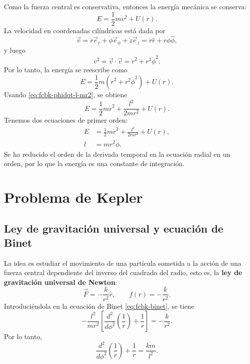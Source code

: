 \documentclass[../apunte_mecanica_clasica.tex]{subfiles}%
\begin{document}
Como la fuerza central es conservativa, entonces la energía mecánica se conserva:
\begin{equation}
    E=\frac{1}{2}mv^2+U(r).
    \label{eq:fcbk-energia-mecanica}
\end{equation}
La velocidad en coordenadas cilíndricas está dada por
\begin{equation}
    \vec v=\dot r\vec e_r+\dot\phi\vec e_\phi+\dot z\vec e_z=\dot r\hat r+r\dot\phi\hat\phi,
    \label{eq:fcbk-velocidad-cilindrica}
\end{equation}
y luego
\begin{equation}
    v^2=\vec v\cdot\vec v=\dot r^2+r^2\dot\phi^2.
    \label{eq:fcbk-v2-cilindrica}
\end{equation}
Por lo tanto, la energía se reescribe como
\begin{equation}
    E=\frac{1}{2}m(\dot r^2+r^2\dot\phi^2)+U(r).
    \label{eq:fcbk-energia-r-phi}
\end{equation}
Usando \eqref{eq:fcbk-phidot-l-mr2}, se obtiene
\begin{equation}
    E=\frac{1}{2}m\dot r^2+\frac{l^2}{2mr^2}+U(r).
    \label{eq:fcbk-energia-reducida}
\end{equation}
Tenemos dos ecuaciones de primer orden:
\begin{align}
    E&=\frac{1}{2}m\dot r^2+\frac{l^2}{2mr^2}+U(r),
    \label{eq:fcbk-energia-reducida-resumen}\\
    l&=mr^2\dot\phi.
    \label{eq:fcbk-l-resumen-final}
\end{align}
Se ha reducido el orden de la derivada temporal en la ecuación radial en un orden, por lo que la energía es una constante de integración.

\newpage
\section{Problema de Kepler}

\subsection{Ley de gravitación universal y ecuación de Binet}

La idea es estudiar el movimiento de una partícula sometida a la acción de una fuerza central dependiente del inverso del cuadrado del radio, esto es, la \textbf{ley de gravitación universal de Newton}:
\begin{equation}
    \vec F=-\frac{k}{r^2}\hat r,
    \qquad
    f(r)=-\frac{k}{r^2}.
    \label{eq:fcbk-kepler-fuerza-inversa-cuadrado}
\end{equation}
Introduciéndola en la ecuación de Binet \eqref{eq:fcbk-binet}, se tiene
\begin{equation}
    -\frac{l^2}{mr^2}\left[\frac{d^2}{d\phi^2}\left(\frac{1}{r}\right)+\frac{1}{r}\right]
    =-\frac{k}{r^2}.
    \label{eq:fcbk-kepler-binet-sustitucion}
\end{equation}
Por lo tanto,
\begin{equation}
    \frac{d^2}{d\phi^2}\left(\frac{1}{r}\right)+\frac{1}{r}=\frac{km}{l^2}.
    \label{eq:fcbk-kepler-binet-final}
\end{equation}
\end{document}
